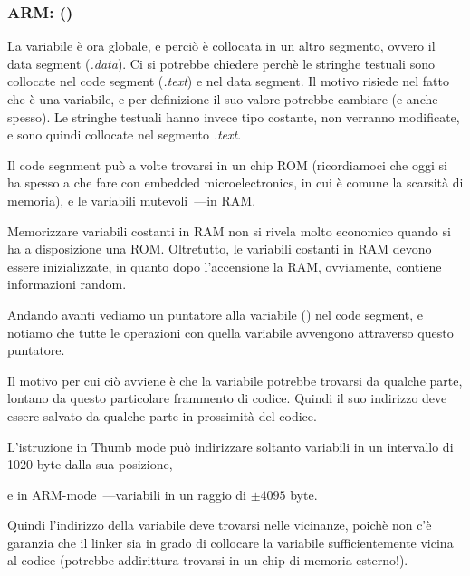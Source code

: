 \subsubsection{ARM: \OptimizingKeilVI (\ThumbMode)}



La variabile  è ora globale, e perciò è collocata in un altro segmento, ovvero il data segment (\emph{.data}).
Ci si potrebbe chiedere perchè le stringhe testuali sono collocate nel code segment (\emph{.text}) e  nel data segment.
Il motivo risiede nel fatto che  è una variabile, e per definizione il suo valore potrebbe cambiare (e anche spesso).
Le stringhe testuali hanno invece tipo costante, non verranno modificate, e sono quindi collocate nel segmento \emph{.text}.
\myindex{\RAM}
\myindex{\ROM}

Il code segnment può a volte trovarsi in un chip \ac{ROM} (ricordiamoci che oggi si ha spesso a che fare con embedded microelectronics, in cui è comune la scarsità di memoria), e le variabili mutevoli~---in \ac{RAM}.

Memorizzare variabili costanti in RAM non si rivela molto economico quando si ha a disposizione una ROM.
Oltretutto, le variabili costanti in RAM devono essere inizializzate, in quanto dopo l'accensione la RAM, ovviamente, contiene informazioni random.


Andando avanti vediamo un puntatore alla variabile  () nel code segment, e notiamo che tutte le operazioni con quella variabile avvengono attraverso questo puntatore.

Il motivo per cui ciò avviene è che la variabile  potrebbe trovarsi da qualche parte, lontano da questo particolare frammento di codice. Quindi il suo indirizzo deve essere salvato da qualche parte in prossimità del codice.

L'istruzione  in Thumb mode può indirizzare soltanto variabili in un intervallo di 1020 byte dalla sua posizione, 

e in ARM-mode~---variabili in un raggio di $\pm{}4095$ byte.

Quindi l'indirizzo della variabile  deve trovarsi nelle vicinanze, poichè non c'è garanzia che il linker sia in grado di collocare la variabile sufficientemente vicina al codice (potrebbe addirittura trovarsi in un chip di memoria esterno!).

